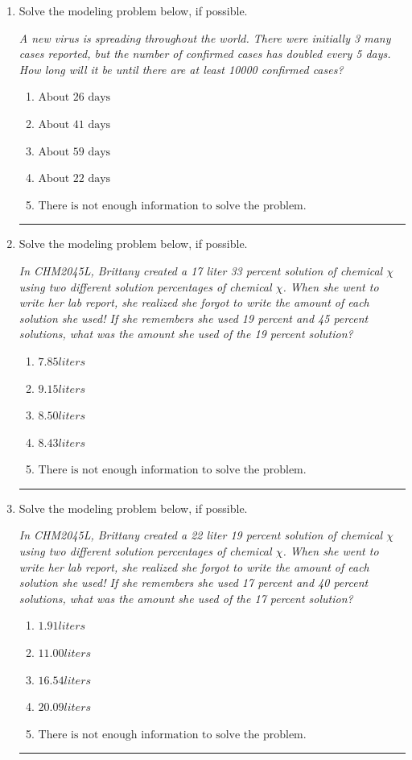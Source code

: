 \documentclass[14pt]{extbook}
\newcommand{\litem}[1]{\item#1\hspace*{-1cm}\rule{\textwidth}{0.4pt}}
\begin{document}
\begin{enumerate}
{\begin{enumerate}[label=\Alph*.]
\end{enumerate} }
\litem{
Solve the modeling problem below, if possible.
\begin{center}
    \textit{ A new virus is spreading throughout the world. There were initially 3 many cases reported, but the number of confirmed cases has doubled every 5 days. How long will it be until there are at least 10000 confirmed cases? }
\end{center}
\begin{enumerate}[label=\Alph*.]
\item \( \text{About } 26 \text{ days} \)
\item \( \text{About } 41 \text{ days} \)
\item \( \text{About } 59 \text{ days} \)
\item \( \text{About } 22 \text{ days} \)
\item \( \text{There is not enough information to solve the problem.} \)

\end{enumerate} }
\litem{
Solve the modeling problem below, if possible.
\begin{center}
    \textit{ In CHM2045L, Brittany created a 17 liter 33 percent solution of chemical $\chi$ using two different solution percentages of chemical $\chi$. When she went to write her lab report, she realized she forgot to write the amount of each solution she used! If she remembers she used 19 percent and 45 percent solutions, what was the amount she used of the 19 percent solution? }
\end{center}
\begin{enumerate}[label=\Alph*.]
\item \( 7.85 liters \)
\item \( 9.15 liters \)
\item \( 8.50 liters \)
\item \( 8.43 liters \)
\item \( \text{There is not enough information to solve the problem.} \)

\end{enumerate} }
\litem{
Solve the modeling problem below, if possible.
\begin{center}
    \textit{ In CHM2045L, Brittany created a 22 liter 19 percent solution of chemical $\chi$ using two different solution percentages of chemical $\chi$. When she went to write her lab report, she realized she forgot to write the amount of each solution she used! If she remembers she used 17 percent and 40 percent solutions, what was the amount she used of the 17 percent solution? }
\end{center}
\begin{enumerate}[label=\Alph*.]
\item \( 1.91 liters \)
\item \( 11.00 liters \)
\item \( 16.54 liters \)
\item \( 20.09 liters \)
\item \( \text{There is not enough information to solve the problem.} \)


\end{enumerate}}
\end{enumerate}
\end{document}
